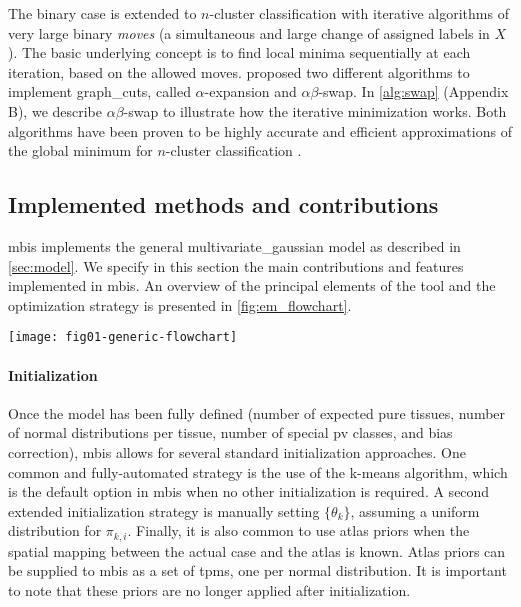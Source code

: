 The binary case is extended to $n$-cluster classification
  with iterative algorithms of very large binary \emph{moves}
  (a simultaneous and large change of assigned labels in $X$).
The basic underlying concept is to find local minima sequentially
  at each iteration, based on the allowed moves.
\citeauthor{boykov_fast_2001} \citep{boykov_fast_2001,kolmogorov_what_2004}
  proposed two different algorithms to implement \gls*{graph_cuts},
  called $\alpha$-expansion and $\alpha\beta$-swap.
In \autoref{alg:swap} (Appendix B), we describe $\alpha\beta$-swap to illustrate
  how the iterative minimization works.
Both algorithms have been proven to be highly accurate and efficient
  approximations of the global minimum for $n$-cluster classification
  \citep{boykov_experimental_2004}.
  
\subsection{Implemented methods and contributions}
\label{sec:implementation_details}
\Gls*{mbis} implements the general \gls*{multivariate_gaussian} model as
  described in \autoref{sec:model}.
We specify in this section the main contributions and features
  implemented in \gls*{mbis}.
An overview of the principal elements of the tool and the optimization
  strategy is presented in \autoref{fig:em_flowchart}.
\begin{figure*}[t]
	\texttt{[image: fig01-generic-flowchart]}
	\caption[Segmentation flowchart]{\Gls*{e_m}-\gls*{graph_cuts} segmentation
	takes as inputs the blocks depicted in white background and produces the
	blocks in brown background as outputs.
	Typically, the initialization can be performed supplying a file with
	the parameters of the model, or prior \glspl*{tpm} from an atlas (optional
	inputs are represented with a dashed line connector).}
	\label{fig:em_flowchart}
\end{figure*}

\paragraph{Initialization}\label{par:initialization} %
Once the model has been fully defined (number of expected pure tissues,
  number of normal distributions per tissue, number of special \gls*{pv}
  classes, and bias correction), \gls*{mbis} allows
  for several standard initialization approaches.
One common and fully-automated strategy is the use of the
  k-means algorithm, which is the default option in \gls*{mbis} when
  no other initialization is required.
A second extended initialization strategy is manually setting $\{\theta_k\}$,
  assuming a uniform distribution for $\pi_{k,i}$.
Finally, it is also common to use atlas priors when the spatial mapping
  between the actual case and the atlas is known.
Atlas priors can be supplied to \gls*{mbis} as a set of \glspl*{tpm},
  one per normal distribution.
It is important to note that these priors are no longer applied
  after initialization.


